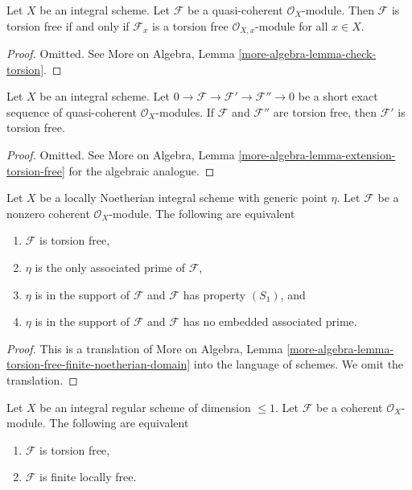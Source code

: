 \begin{lemma}
\label{lemma-check-torsion}
Let $X$ be an integral scheme. Let $\mathcal{F}$ be a quasi-coherent
$\mathcal{O}_X$-module. Then $\mathcal{F}$ is torsion free if and only if
$\mathcal{F}_x$ is a torsion free $\mathcal{O}_{X, x}$-module for all $x \in X$.
\end{lemma}

\begin{proof}
Omitted. See More on Algebra, Lemma
\ref{more-algebra-lemma-check-torsion}.
\end{proof}

\begin{lemma}
\label{lemma-extension-torsion-free}
Let $X$ be an integral scheme. Let
$0 \to \mathcal{F} \to \mathcal{F}' \to \mathcal{F}'' \to 0$
be a short exact sequence of quasi-coherent $\mathcal{O}_X$-modules.
If $\mathcal{F}$ and $\mathcal{F}''$ are torsion free, then $\mathcal{F}'$
is torsion free.
\end{lemma}

\begin{proof}
Omitted. See
More on Algebra, Lemma \ref{more-algebra-lemma-extension-torsion-free}
for the algebraic analogue.
\end{proof}

\begin{lemma}
\label{lemma-torsion-free-finite-noetherian-domain}
Let $X$ be a locally Noetherian integral scheme with generic point $\eta$.
Let $\mathcal{F}$ be a nonzero coherent $\mathcal{O}_X$-module.
The following are equivalent
\begin{enumerate}
\item $\mathcal{F}$ is torsion free,
\item $\eta$ is the only associated prime of $\mathcal{F}$,
\item $\eta$ is in the support of $\mathcal{F}$ and $\mathcal{F}$
has property $(S_1)$, and
\item $\eta$ is in the support of $\mathcal{F}$ and $\mathcal{F}$
has no embedded associated prime.
\end{enumerate}
\end{lemma}

\begin{proof}
This is a translation of More on Algebra, Lemma
\ref{more-algebra-lemma-torsion-free-finite-noetherian-domain}
into the language of schemes. We omit the translation.
\end{proof}

\begin{lemma}
\label{lemma-torsion-free-over-regular-dim-1}
Let $X$ be an integral regular scheme of dimension $\leq 1$.
Let $\mathcal{F}$ be a coherent $\mathcal{O}_X$-module.
The following are equivalent
\begin{enumerate}
\item $\mathcal{F}$ is torsion free,
\item $\mathcal{F}$ is finite locally free.
\end{enumerate}
\end{lemma}

